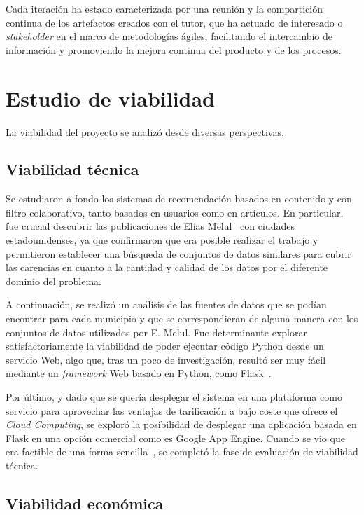Cada iteración ha estado caracterizada por una reunión y la compartición continua de los artefactos creados con el tutor, que ha actuado de interesado o \textit{stakeholder} en el marco de metodologías ágiles, facilitando el intercambio de información y promoviendo la mejora continua del producto y de los procesos.

\section{Estudio de viabilidad}

La viabilidad del proyecto se analizó desde diversas perspectivas.

\subsection{Viabilidad técnica}

Se estudiaron a fondo los sistemas de recomendación basados en contenido y con filtro colaborativo, tanto basados en usuarios como en artículos. En particular, fue crucial descubrir las publicaciones de Elias Melul~\cite{US1, US2, US3} con ciudades estadounidenses, ya que confirmaron que era posible realizar el trabajo y permitieron establecer una búsqueda de conjuntos de datos similares para cubrir las carencias en cuanto a la cantidad y calidad de los datos por el diferente dominio del problema.

A continuación, se realizó un análisis de las fuentes de datos que se podían encontrar para cada municipio y que se correspondieran de alguna manera con los conjuntos de datos utilizados por E. Melul. Fue determinante explorar satisfactoriamente la viabilidad de poder ejecutar código Python desde un servicio Web, algo que, tras un poco de investigación, resultó ser muy fácil mediante un \textit{framework} Web basado en Python, como Flask~\cite{flask_so}.

Por último, y dado que se quería desplegar el sistema en una plataforma como servicio para aprovechar las ventajas de tarificación a bajo coste que ofrece el \textit{Cloud Computing}, se exploró la posibilidad de desplegar una aplicación basada en Flask en una opción comercial como es Google App Engine. Cuando se vio que era factible de una forma sencilla~\cite{flask_app_engine}, se completó la fase de evaluación de viabilidad técnica.

\subsection{Viabilidad económica}


